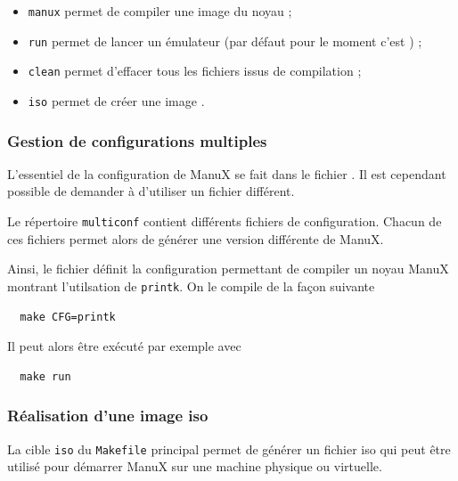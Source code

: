 \begin{itemize}
   \item {\tt manux} permet de compiler une image du noyau ;
   \item {\tt run} permet de lancer un émulateur (par défaut pour le moment c'est \qemu) ;
   \item {\tt clean} permet d'effacer tous les fichiers issus de compilation ;
   \item {\tt iso} permet de créer une image \iso.
\end{itemize}

%
\subsubsection{Gestion de configurations multiples}

   L'essentiel de la configuration de ManuX se fait dans le fichier
. Il est cependant possible de
demander à \make d'utiliser un fichier différent.

   Le répertoire {\tt multiconf} contient différents fichiers de
configuration. Chacun de ces fichiers permet alors de générer une
version différente de ManuX.

   Ainsi, le fichier  définit la
configuration permettant de compiler un noyau ManuX montrant
l'utilsation de {\tt printk}. On le compile de la façon suivante

\begin{lstlisting}
  make CFG=printk
\end{lstlisting}

   Il peut alors être exécuté par exemple avec

\begin{lstlisting}
  make run
\end{lstlisting}

%
\subsubsection{Réalisation d'une image {\sc iso}}

   La cible {\tt iso}  du {\tt Makefile} principal permet de générer
un fichier {\sc iso} qui peut être utilisé pour démarrer ManuX sur une
machine physique ou virtuelle.

